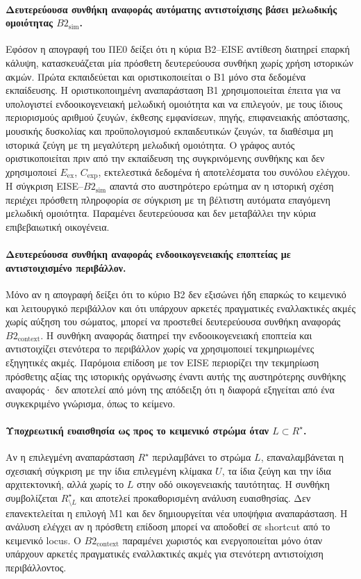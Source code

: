 \documentclass[11pt,a4paper]{article}
\begin{document}
\paragraph{Δευτερεύουσα συνθήκη αναφοράς αυτόματης αντιστοίχισης βάσει μελωδικής ομοιότητας $B2_{\mathrm{sim}}$.}
Εφόσον η απογραφή του ΠΕ0 δείξει ότι η κύρια B2--EISE αντίθεση διατηρεί επαρκή κάλυψη, κατασκευάζεται μία πρόσθετη δευτερεύουσα συνθήκη χωρίς χρήση ιστορικών ακμών. Πρώτα εκπαιδεύεται και οριστικοποιείται ο B1 μόνο στα δεδομένα εκπαίδευσης. Η οριστικοποιημένη αναπαράσταση B1 χρησιμοποιείται έπειτα για να υπολογιστεί ενδοοικογενειακή μελωδική ομοιότητα και να επιλεγούν, με τους ίδιους περιορισμούς αριθμού ζευγών, έκθεσης εμφανίσεων, πηγής, επιφανειακής απόστασης, μουσικής δυσκολίας και προϋπολογισμού εκπαιδευτικών ζευγών, τα διαθέσιμα μη ιστορικά ζεύγη με τη μεγαλύτερη μελωδική ομοιότητα. Ο γράφος αυτός οριστικοποιείται πριν από την εκπαίδευση της συγκρινόμενης συνθήκης και δεν χρησιμοποιεί $E_{\mathrm{ex}}$, $C_{\mathrm{exp}}$, εκτελεστικά δεδομένα ή αποτελέσματα του συνόλου ελέγχου. Η σύγκριση EISE--$B2_{\mathrm{sim}}$ απαντά στο αυστηρότερο ερώτημα αν η ιστορική σχέση περιέχει πρόσθετη πληροφορία σε σύγκριση με τη βέλτιστη αυτόματα επαγόμενη μελωδική ομοιότητα. Παραμένει δευτερεύουσα και δεν μεταβάλλει την κύρια επιβεβαιωτική οικογένεια.

\paragraph{Δευτερεύουσα συνθήκη αναφοράς ενδοοικογενειακής εποπτείας με αντιστοιχισμένο περιβάλλον.}
Μόνο αν η απογραφή δείξει ότι το κύριο B2 δεν εξισώνει ήδη επαρκώς το κειμενικό και λειτουργικό περιβάλλον και ότι υπάρχουν αρκετές πραγματικές εναλλακτικές ακμές χωρίς αύξηση του σώματος, μπορεί να προστεθεί δευτερεύουσα συνθήκη αναφοράς $B2_{\mathrm{context}}$. Η συνθήκη αναφοράς διατηρεί την ενδοοικογενειακή εποπτεία και αντιστοιχίζει στενότερα το περιβάλλον χωρίς να χρησιμοποιεί τεκμηριωμένες εξηγητικές ακμές. Παρόμοια επίδοση με τον EISE περιορίζει την τεκμηρίωση πρόσθετης αξίας της ιστορικής οργάνωσης έναντι αυτής της αυστηρότερης συνθήκης αναφοράς· δεν αποτελεί από μόνη της απόδειξη ότι η διαφορά εξηγείται από ένα συγκεκριμένο γνώρισμα, όπως το κείμενο.

\paragraph{Υποχρεωτική ευαισθησία ως προς το κειμενικό στρώμα όταν $L\subset R^\star$.}
Αν η επιλεγμένη αναπαράσταση $R^\star$ περιλαμβάνει το στρώμα $L$, επαναλαμβάνεται η σχεσιακή σύγκριση με την ίδια επιλεγμένη κλίμακα $U$, τα ίδια ζεύγη και την ίδια αρχιτεκτονική, αλλά χωρίς το $L$ στην οδό οικογενειακής ταυτότητας. Η συνθήκη συμβολίζεται $R^\star_{\setminus L}$ και αποτελεί προκαθορισμένη ανάλυση ευαισθησίας. Δεν επανεκτελείται η επιλογή M1 και δεν δημιουργείται νέα υποψήφια αναπαράσταση. Η ανάλυση ελέγχει αν η πρόσθετη επίδοση μπορεί να αποδοθεί σε shortcut από το κειμενικό locus. Ο $B2_{\mathrm{context}}$ παραμένει χωριστός και ενεργοποιείται μόνο όταν υπάρχουν αρκετές πραγματικές εναλλακτικές ακμές για στενότερη αντιστοίχιση περιβάλλοντος.
\end{document}

